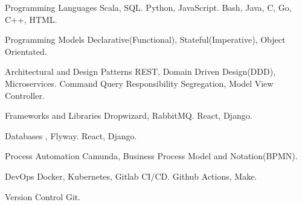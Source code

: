 

\begin{cvskills}
  \cvskill
    {Programming Languages} %
    {  Scala, SQL.} 
  \cvskill
    {} %
    {  Python, JavaScript. } 
  \cvskill
    {} %
    {  Bash, Java, C, Go, C++, HTML.} 

  \cvskill
    {Programming Models} %
    { Declarative(Functional), Stateful(Imperative), Object Orientated.} 

  \cvskill
    {Architectural and Design Patterns} %
    {  REST, Domain Driven Design(DDD), Microservices.}
    \cvskill
    {} %
    {  Command Query Responsibility Segregation, Model View Controller.} 

  \cvskill
    {Frameworks and Libraries} %
    {  Dropwizard, RabbitMQ.} 
  \cvskill
    {} %
    {  React, Django.} 

  \cvskill
  {Databases} %
  {  , Flyway.} 
  \cvskill
  {} %
  {  React, Django.} 

  \cvskill
    {Process Automation}
    { Camunda, Business Process Model and Notation(BPMN).}

  \cvskill
    {DevOps} %
    { Docker, Kubernetes, Gitlab CI/CD.} %
  \cvskill
    {} %
    {  Github Actions, Make.} 

  \cvskill
  {Version Control} %
  { Git.} %

\end{cvskills}
